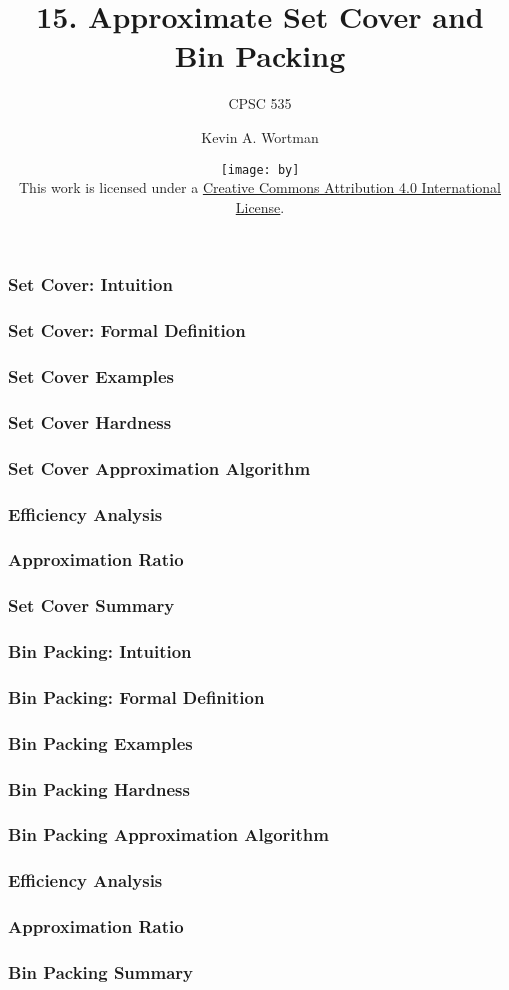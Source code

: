 \documentclass{beamer}
\title{15. Approximate Set Cover and Bin Packing}
\subtitle{CPSC 535}
\author{Kevin A. Wortman}
\institute{ \texttt{[image: csuf-logo-cmyk]} }
\date{\texttt{[image: by]} \\

{\tiny
This work is licensed under a
\href{http://creativecommons.org/licenses/by/4.0/}{Creative Commons Attribution 4.0 International License}.
}}
\begin{document}
\begin{frame}
  \titlepage
\end{frame}

\begin{frame} \frametitle{Set Cover: Intuition}
\end{frame}

\begin{frame} \frametitle{Set Cover: Formal Definition}
\end{frame}

\begin{frame} \frametitle{Set Cover Examples}
\end{frame}

\begin{frame} \frametitle{Set Cover Hardness}
\end{frame}

\begin{frame} \frametitle{Set Cover Approximation Algorithm}
\end{frame}

\begin{frame} \frametitle{Efficiency Analysis}
\end{frame}

\begin{frame} \frametitle{Approximation Ratio}
\end{frame}

\begin{frame} \frametitle{Set Cover Summary}
\end{frame}

\begin{frame} \frametitle{Bin Packing: Intuition}
\end{frame}

\begin{frame} \frametitle{Bin Packing: Formal Definition}
\end{frame}

\begin{frame} \frametitle{Bin Packing Examples}
\end{frame}

\begin{frame} \frametitle{Bin Packing Hardness}
\end{frame}

\begin{frame} \frametitle{Bin Packing Approximation Algorithm}
\end{frame}

\begin{frame} \frametitle{Efficiency Analysis}
\end{frame}

\begin{frame} \frametitle{Approximation Ratio}
\end{frame}

\begin{frame} \frametitle{Bin Packing Summary}
\end{frame}
\end{document}
